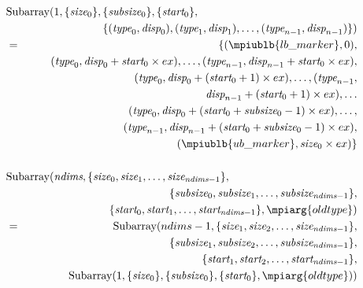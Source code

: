 \begin{eqnarray}
\lefteqn{\mbox{Subarray}(1,\{\mword{size}_0\},\{\mword{subsize}_0\},\{\mword{start}_0\},}
\label{eq:subarray-base} \\
& & \quad \{(\mword{type}_0,\mword{disp}_0),(\mword{type}_1,\mword{disp}_1),\ldots,(\mword{type}_{n-1},\mword{disp}_{n-1})\}) \nonumber \\
& = & \{(\mpiublb{lb\_marker},0), \nonumber \\
& & (\mword{type}_0,\mword{disp}_0+\mword{start}_0 \times ex),\ldots,(\mword{type}_{n-1},
        \mword{disp}_{n-1} + \mword{start}_0 \times ex), \nonumber \\
& & (\mword{type}_0,\mword{disp}_0+(\mword{start}_0 + 1)\times ex),\ldots,(\mword{type}_{n-1},
\nonumber\\
& & \hspace{.5in}\mword{disp}_{n-1} + (\mword{start}_0+1) \times ex), \ldots \nonumber \\
& & (\mword{type}_0,\mword{disp}_0+(\mword{start}_0 + \mword{subsize}_0 - 1)\times ex),\ldots,
\nonumber \\
& & \hspace{.5in}(\mword{type}_{n-1},\mword{disp}_{n-1} + (\mword{start}_0+\mword{subsize}_0 - 1) \times ex),
\nonumber \\
& & (\mpiublb{ub\_marker}, \mword{size}_0 \times ex) \} \nonumber \\
& & \nonumber \\
\lefteqn{\mbox{Subarray}( \mword{ndims},
\{\mword{size}_0, \mword{size}_1,\ldots,\mword{size}_{\msword{ndims}-1}\},}       \label{eq:subarray-fortran} \\
& & \quad\{\mword{subsize}_0, \mword{subsize}_1,\ldots,\mword{subsize}_{\msword{ndims}-1}\}, \nonumber \\
& & \quad \{\mword{start}_0, \mword{start}_1,\ldots,\mword{start}_{\msword{ndims}-1}\},\mpiarg{oldtype} )
\nonumber \\
& = & \mbox{Subarray}(ndims-1,\{\mword{size}_1, \mword{size}_2,\ldots,\mword{size}_{\msword{ndims}-1}\},
\nonumber \\
& &\quad\{\mword{subsize}_1, \mword{subsize}_2,\ldots,\mword{subsize}_{\msword{ndims}-1}\}, \nonumber\\
& &\quad\{\mword{start}_1, \mword{start}_2,\ldots,\mword{start}_{\msword{ndims}-1}\}, \nonumber \\
& & \hspace{.5in}\mbox{Subarray}(1,\{\mword{size}_0\},\{\mword{subsize}_0\},\{\mword{start}_0\},
        \mpiarg{oldtype}))\nonumber \\

\end{eqnarray}
